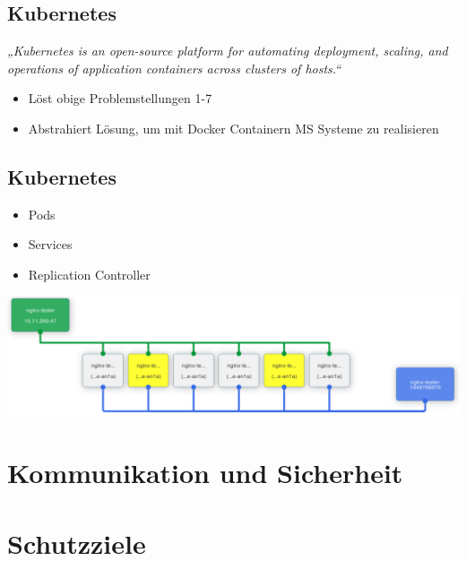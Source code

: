 \documentclass{beamer}
\begin{document}
\subsection{Kubernetes}
\begin{frame}{\insertsubsection}
	\textit{„Kubernetes is an open-source platform for automating deployment, scaling, and operations of application containers across clusters of hosts.“}\cite{k8sdoc}
	\vspace{1em}
	\begin{itemize}
		\setlength\itemsep{1em}
		\item Löst obige Problemstellungen 1-7
		\item Abstrahiert Lösung, um mit Docker Containern MS Systeme zu realisieren
	\end{itemize}
\end{frame}

\subsection{Kubernetes}
\begin{frame}{\insertsubsection}
	\begin{itemize}
		\setlength\itemsep{1em}
		\item Pods
		\item Services
		\item Replication Controller
	\end{itemize}
	\vspace{1em}
	\includegraphics[width=\linewidth]{img/pods-getting-ready-k8s.pdf}
\end{frame}
		
\section{Kommunikation und Sicherheit}





\section{Schutzziele}
\end{document}

